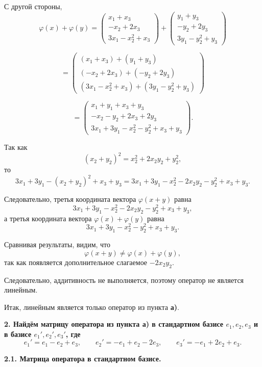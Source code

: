 С другой стороны,
\[
\varphi(x)+\varphi(y)=
\begin{pmatrix}
x_1+x_3\\
-x_2+2x_3\\
3x_1-x_2^2+x_3
\end{pmatrix}
+
\begin{pmatrix}
y_1+y_3\\
-y_2+2y_3\\
3y_1-y_2^2+y_3
\end{pmatrix}
\]

\[
=
\begin{pmatrix}
(x_1+x_3)+(y_1+y_3)\\
(-x_2+2x_3)+(-y_2+2y_3)\\
(3x_1-x_2^2+x_3)+(3y_1-y_2^2+y_3)
\end{pmatrix}
\]

\[
=
\begin{pmatrix}
x_1+y_1+x_3+y_3\\
-x_2-y_2+2x_3+2y_3\\
3x_1+3y_1-x_2^2-y_2^2+x_3+y_3
\end{pmatrix}.
\]

Так как
\[
(x_2+y_2)^2=x_2^2+2x_2y_2+y_2^2,
\]
то
\[
3x_1+3y_1-(x_2+y_2)^2+x_3+y_3
=
3x_1+3y_1-x_2^2-2x_2y_2-y_2^2+x_3+y_3.
\]

Следовательно, третья координата вектора $\varphi(x+y)$ равна
\[
3x_1+3y_1-x_2^2-2x_2y_2-y_2^2+x_3+y_3,
\]
а третья координата вектора $\varphi(x)+\varphi(y)$ равна
\[
3x_1+3y_1-x_2^2-y_2^2+x_3+y_3.
\]

Сравнивая результаты, видим, что
\[
\varphi(x+y)\neq \varphi(x)+\varphi(y),
\]
так как появляется дополнительное слагаемое $-2x_2y_2$.

Следовательно, аддитивность не выполняется, поэтому оператор не является линейным.

\bigskip

Итак, линейным является только оператор из пункта \textbf{а)}.

\bigskip

\textbf{2. Найдём матрицу оператора из пункта а) в стандартном базисе $e_1,e_2,e_3$ и в базисе $e_1',e_2',e_3'$, где}
\[
e_1' = e_1 - e_2 + e_3,
\qquad
e_2' = -e_1 + e_2 - 2e_3,
\qquad
e_3' = -e_1 + 2e_2 + e_3.
\]

\bigskip

\textbf{2.1. Матрица оператора в стандартном базисе.}

